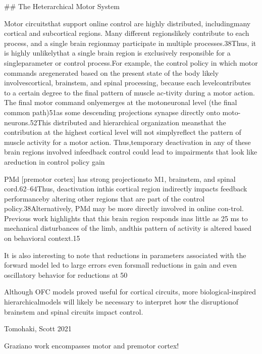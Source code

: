 \documentclass[../main.tex]{subfiles}
\begin{document}
{{ ## The Heterarchical Motor System 

 Motor circuitsthat support online control are highly distributed, includingmany cortical and subcortical regions. Many different regionslikely contribute to each process, and a single brain regionmay participate in multiple processes.38Thus, it is highly unlikelythat a single brain region is exclusively responsible for a singleparameter or control process.For example, the control policy in which motor commands aregenerated based on the present state of the body likely involvescortical, brainstem, and spinal processing, because each levelcontributes to a certain degree to the final pattern of muscle ac-tivity during a motor action. The final motor command onlyemerges at the motoneuronal level (the final common path)51as some descending projections synapse directly onto moto-neurons.52This distributed and hierarchical organization meansthat the contribution at the highest cortical level will not simplyreflect the pattern of muscle activity for a motor action. Thus,temporary deactivation in any of these brain regions involved infeedback control could lead to impairments that look like areduction in control policy gain

PMd [premotor cortex] has strong projectionsto M1, brainstem, and spinal cord.62–64Thus, deactivation inthis cortical region indirectly impacts feedback performanceby altering other regions that are part of the control policy.38Alternatively, PMd may be more directly involved in online con-trol. Previous work highlights that this brain region responds inas little as 25 ms to mechanical disturbances of the limb, andthis pattern of activity is altered based on behavioral context.15

It is also interesting to note that reductions in parameters associated with the forward model led to large errors even forsmall reductions in gain and even oscillatory behavior for reductions at50%

Although OFC models proved useful for cortical circuits, more biological-inspired hierarchicalmodels will likely be necessary to interpret how the disruptionof brainstem and spinal circuits impact control.

Tomohaki, Scott 2021 

Graziano work encompasses motor and premotor cortex!

}}
\end{document}
